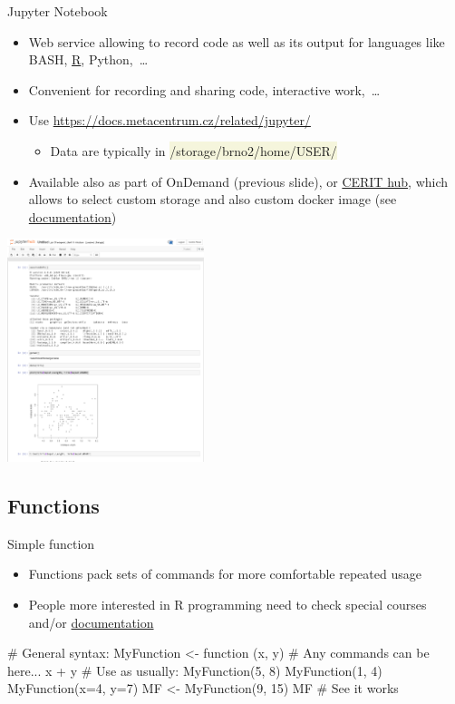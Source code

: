 \documentclass[compress, xelatex, 11pt, xcolor=svgnames, aspectratio=169,
	hyperref={
		bookmarks=true,
		unicode=true,
		colorlinks=true,
		pdftitle={Molecular data in R},
		plainpages=false,
		pdfauthor={Vojtech Zeisek},
		pdfsubject={Course about phylogeny and evolution in R},
		pdfcreator={XeLaTeX},
		pdfkeywords={R, evolution, phylogeny, molecular data},
		linkcolor=Crimson, %
		anchorcolor=Magenta, %
		citecolor=Magenta, %
		filecolor=Magenta, %
		menucolor=Magenta, %
		urlcolor=DodgerBlue, %
		},
	url={hyphens, lowtilde} %
	]{beamer}
\renewcommand{\texttt}[1]{\colorbox{Beige}{{\ttfamily #1}}}
\begin{document}
\begin{frame}{Jupyter Notebook}
	\begin{multicols}{2}
		\begin{itemize}
			\item Web service allowing to record code as well as its output for languages like BASH, \href{https://wiki.metacentrum.cz/wiki/Jupyter_for_MetaCentrum_users\#Adding_R_kernel}{R}, Python,~\ldots
			\item Convenient for recording and sharing code, interactive work,~\ldots
			\item Use \url{https://docs.metacentrum.cz/related/jupyter/}
			\begin{itemize}
				\item Data are typically in \texttt{/storage/brno2/home/USER/}
			\end{itemize}
			\item Available also as part of OnDemand (previous slide), or \href{https://hub.cloud.e-infra.cz}{CERIT hub}, which allows to select custom storage and also custom docker image (see \href{https://docs.cerit.io/docs/jupyterhub.html}{documentation})
		\end{itemize}
		\begin{center}
			\includegraphics[height=6.5cm]{jupyter.png}
		\end{center}
	\end{multicols}
\end{frame}

\subsection{Functions}

\begin{frame}[fragile]{Simple function}
	\begin{itemize}
		\item Functions pack sets of commands for more comfortable repeated usage
		\item People more interested in R programming need to check special courses and/or \href{https://CRAN.R-project.org/manuals.html}{documentation}
	\end{itemize}
	\begin{spluscode}
    # General syntax:
    MyFunction <- function (x, y) {
      # Any commands can be here...
      x + y
      }
    # Use as usually:
    MyFunction(5, 8)
    MyFunction(1, 4)
    MyFunction(x=4, y=7)
    MF <- MyFunction(9, 15)
    MF # See it works
	\end{spluscode}
\end{frame}
\end{document}
